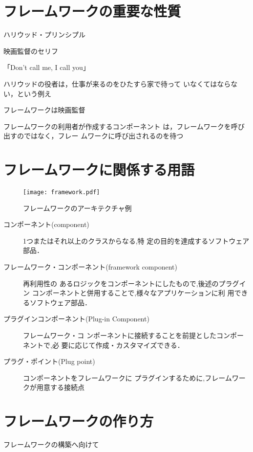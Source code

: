\documentclass[a4j,papersize]{jsbook}
\begin{document}
\section{フレームワークの重要な性質}
ハリウッド・プリンシプル 

映画監督のセリフ 

「Don’t call me, I call you」 

 ハリウッドの役者は，仕事が来るのをひたすら家で待って
いなくてはならない，という例え 

フレームワークは映画監督 

フレームワークの利用者が作成するコンポーネント
は，フレームワークを呼び出すのではなく，フレー
ムワークに呼び出されるのを待つ 

\section{フレームワークに関係する用語}

\begin{figure}
 \begin{center}
  \texttt{[image: framework.pdf]}
  \caption{フレームワークのアーキテクチャ例}
 \end{center}
\end{figure}

\begin{description}
 \item[コンポーネント(component)] 1つまたはそれ以上のクラスからなる,特
	    定の目的を達成するソフトウェア部品．
 \item[フレームワーク・コンポーネント(framework component)] 再利用性の
	    あるロジックをコンポーネントにしたもので,後述のプラグイン
	    コンポーネントと併用することで,様々なアプリケーションに利
	    用できるソフトウェア部品．
 \item[プラグインコンポーネント(Plug-in Component)] フレームワーク・コ
	    ンポーネントに接続することを前提としたコンポーネントで,必
	    要に応じて作成・カスタマイズできる．
 \item[プラグ・ポイント(Plug point)] コンポーネントをフレームワークに
	    プラグインするために,フレームワークが用意する接続点
\end{description}

\section{フレームワークの作り方}
フレームワークの構築へ向けて
\end{document}
